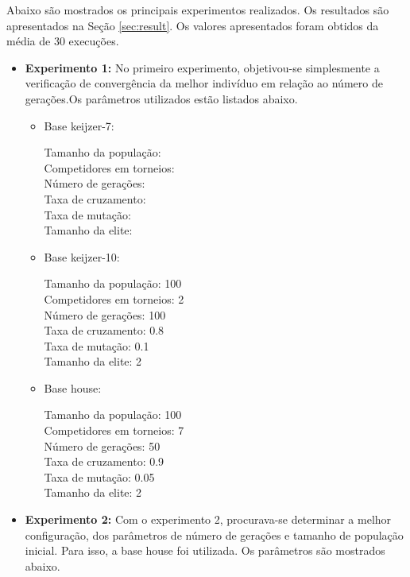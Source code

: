 \documentclass[12pt]{article}
\begin{document}
Abaixo são mostrados os principais experimentos realizados. Os resultados são apresentados
na Seção \ref{sec:result}. Os valores apresentados foram obtidos da média de 30 execuções.

\begin{itemize}
 \item \textbf{Experimento 1:} No primeiro experimento, objetivou-se simplesmente a verificação
 de convergência da melhor indivíduo em relação ao número de gerações.Os parâmetros utilizados
 estão listados abaixo. \\
 
 \begin{itemize}
  \item Base keijzer-7:
  
  Tamanho da população: \\
  Competidores em torneios: \\
  Número de gerações: \\
  Taxa de cruzamento: \\
  Taxa de mutação: \\
  Tamanho da elite: \\
 
  \item Base keijzer-10:
  
  Tamanho da população: 100\\
  Competidores em torneios: 2\\
  Número de gerações: 100\\
  Taxa de cruzamento: 0.8\\
  Taxa de mutação: 0.1\\
  Tamanho da elite: 2\\
  
  \item Base house:
  
  Tamanho da população: 100\\
  Competidores em torneios: 7\\
  Número de gerações: 50\\
  Taxa de cruzamento: 0.9\\
  Taxa de mutação: 0.05\\
  Tamanho da elite: 2\\
  
 \end{itemize}
 
 \item \textbf{Experimento 2:} Com o experimento 2, procurava-se determinar a melhor configuração,
 dos parâmetros de número de gerações e tamanho de população inicial. Para isso, a base house foi
 utilizada. Os parâmetros são mostrados abaixo.
 

\end{itemize}
\end{document}

